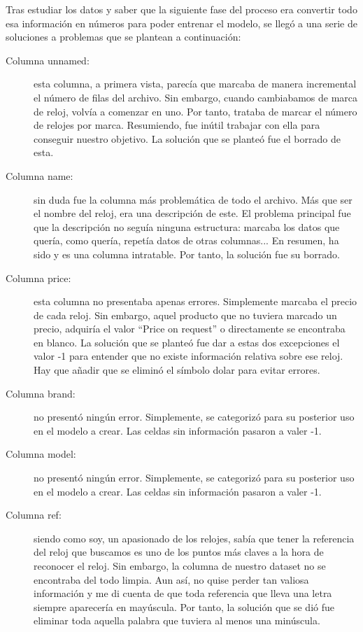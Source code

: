 	Tras estudiar los datos y saber que la siguiente fase del proceso era convertir todo esa información en números para poder entrenar el modelo, se llegó a una serie de soluciones a problemas que se plantean a continuación:
	
\begin{description}
	\item[Columna unnamed:] esta columna, a primera vista, parecía que marcaba de manera incremental el número de filas del archivo. Sin embargo, cuando cambiabamos de marca de reloj, volvía a comenzar en uno. Por tanto, trataba de marcar el número de relojes por marca. Resumiendo, fue inútil trabajar con ella para conseguir nuestro objetivo. La solución que se planteó fue el borrado de esta.
	\item[Columna name:] sin duda fue la columna más problemática de todo el archivo. Más que ser el nombre del reloj, era una descripción de este. El problema principal fue que la descripción no seguía ninguna estructura: marcaba los datos que quería, como quería, repetía datos de otras columnas... En resumen, ha sido y es una columna intratable. Por tanto, la solución fue su borrado.
	\item[Columna price:] esta columna no presentaba apenas errores. Simplemente marcaba el precio de cada reloj. Sin embargo, aquel producto que no tuviera marcado un precio, adquiría el valor “Price on request” o directamente se encontraba en blanco. La solución que se planteó fue dar a estas dos excepciones el valor -1 para entender que no existe información relativa sobre ese reloj. Hay que añadir que se eliminó el símbolo dolar para evitar errores.
	\item[Columna brand:] no presentó ningún error. Simplemente, se categorizó para su posterior uso en el modelo a crear. Las celdas sin información pasaron a valer -1.
	\item[Columna model:] no presentó ningún error. Simplemente, se categorizó para su posterior uso en el modelo a crear. Las celdas sin información pasaron a valer -1.
	\item[Columna ref:] siendo como soy, un apasionado de los relojes, sabía que tener la referencia del reloj que buscamos es uno de los puntos más claves a la hora de reconocer el reloj. Sin embargo, la columna de nuestro dataset no se encontraba del todo limpia. Aun así, no quise perder tan valiosa información y me di cuenta de que toda referencia que lleva una letra siempre aparecería en mayúscula. Por tanto, la solución que se dió fue eliminar toda aquella palabra que tuviera al menos una minúscula.

\end{description}
